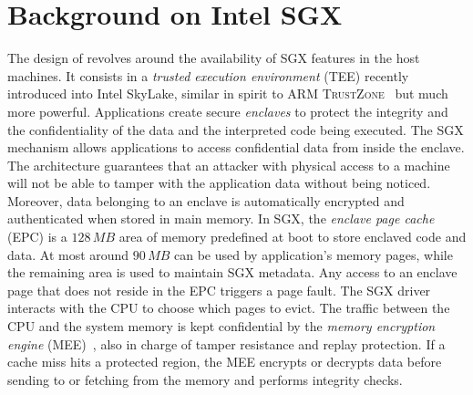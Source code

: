 \section{Background on Intel SGX}\label{sec:background}
The design of \SYS{} revolves around the availability of SGX features in the host machines.
It consists in a \emph{trusted execution environment} (TEE) recently introduced into Intel SkyLake, similar in spirit to ARM \textsc{TrustZone}~\cite{arm2009security} but much more powerful.
Applications create secure \emph{enclaves} to protect the integrity and the confidentiality of the data and the interpreted code being executed. 
% 
The SGX mechanism allows applications to access confidential data from inside the enclave. 
The architecture guarantees that an attacker with physical access to a machine will not be able to tamper with the application data without being noticed. 
Moreover, data belonging to an enclave is automatically encrypted and authenticated when stored in main memory. 
% 
In SGX, the \emph{enclave page cache} (EPC) is a $128\,MB$ area of memory predefined at boot to store enclaved code and data. 
At most around $90\,MB$ can be used by application’s memory pages, while the remaining area is used to maintain SGX metadata. 
Any access to an enclave page that does not reside in the EPC triggers a page fault.
The SGX driver interacts with the CPU to choose which pages to evict. 
The traffic between the CPU and the system memory is kept confidential by the \emph{memory encryption engine} (MEE)~\cite{gueron2016memory}, also in charge of tamper resistance and replay protection. 
If a cache miss hits a protected region, the MEE encrypts or decrypts data before sending to or fetching from the memory and performs integrity checks. 


